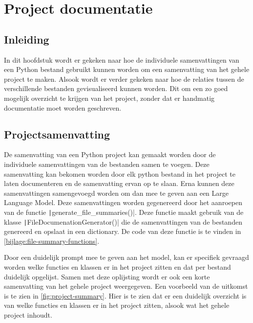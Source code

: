 
\section{Project documentatie}
\label{sec:project-documentatie}

\subsection{Inleiding}
\label{sec:project-documentatie-inleiding}

In dit hoofdstuk wordt er gekeken naar hoe de individuele samenvattingen van een Python bestand gebruikt kunnen worden om een samenvatting van het gehele project te maken.
Alsook wordt er verder gekeken naar hoe de relaties tussen de verschillende bestanden gevisualiseerd kunnen worden.
Dit om een zo goed mogelijk overzicht te krijgen van het project, zonder dat er handmatig documentatie moet worden geschreven.

\subsection{Projectsamenvatting}
\label{sec:project-documentatie-samenvatting}

De samenvatting van een Python project kan gemaakt worden door de individuele samenvattingen van de bestanden samen te voegen.
Deze samenvatting kan bekomen worden door elk python bestand in het project te laten documenteren en de samenvatting ervan op te slaan.
Erna kunnen deze samenvattingen samengevoegd worden om dan mee te geven aan een Large Language Model.
Deze samenvattingen worden gegenereerd door het aanroepen van de functie \texttt|generate_file_summaries()|. 
Deze functie maakt gebruik van de klasse \texttt|FileDocumenationGenerator()| die de samenvattingen van de bestanden genereerd en opslaat in een dictionary.
De code van deze functie is te vinden in \ref{bijlage:file-summary-functions}.  

Door een duidelijk prompt mee te geven aan het model, kan er specifiek gevraagd worden welke functies en klassen er in het project zitten en dat per bestand duidelijk opgelijst. Samen met deze oplijsting wordt er ook een korte samenvatting van het gehele project weergegeven.
Een voorbeeld van de uitkomst is te zien in \ref{fig:project-summary}.
Hier is te zien dat er een duidelijk overzicht is van welke functies en klassen er in het project zitten, alsook wat het gehele project inhoudt.

